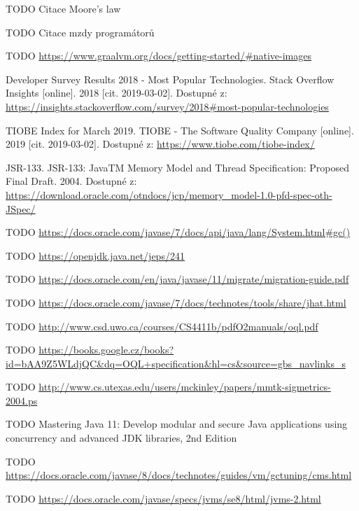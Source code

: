 \begin{literatura}{99}

    TODO Citace Moore's law

    TODO Citace mzdy programátorů

    TODO \url{https://www.graalvm.org/docs/getting-started/#native-images}

	Developer Survey Results 2018 - Most Popular Technologies. Stack Overflow Insights [online]. 2018 [cit. 2019-03-02]. Dostupné z: \url{https://insights.stackoverflow.com/survey/2018#most-popular-technologies}

    TIOBE Index for March 2019. TIOBE - The Software Quality Company [online]. 2019 [cit. 2019-03-02]. Dostupné z: \url{https://www.tiobe.com/tiobe-index/}

    JSR-133. JSR-133: JavaTM Memory Model and Thread Specification: Proposed Final Draft. 2004. Dostupné z: \url{https://download.oracle.com/otndocs/jcp/memory_model-1.0-pfd-spec-oth-JSpec/}
    
    TODO \url{https://docs.oracle.com/javase/7/docs/api/java/lang/System.html#gc()}

    TODO \url{https://openjdk.java.net/jeps/241}

    TODO \url{https://docs.oracle.com/en/java/javase/11/migrate/migration-guide.pdf }

    TODO \url{https://docs.oracle.com/javase/7/docs/technotes/tools/share/jhat.html}

    TODO \url{http://www.csd.uwo.ca/courses/CS4411b/pdfO2manuals/oql.pdf}

    TODO \url{https://books.google.cz/books?id=bAA9Z5WLdjQC&dq=OQL+specification&hl=cs&source=gbs_navlinks_s}

    TODO \url{http://www.cs.utexas.edu/users/mckinley/papers/mmtk-sigmetrics-2004.ps}

    TODO Mastering Java 11: Develop modular and secure Java applications using concurrency and advanced JDK libraries, 2nd Edition

    TODO \url{https://docs.oracle.com/javase/8/docs/technotes/guides/vm/gctuning/cms.html}

    TODO \url{https://docs.oracle.com/javase/specs/jvms/se8/html/jvms-2.html}


\end{literatura}
